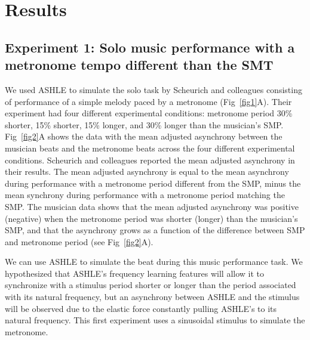 \documentclass[10pt,letterpaper]{article}
\begin{document}
\section*{Results}

\subsection*{Experiment 1: Solo music performance with a metronome tempo different than the SMT}

We used ASHLE to simulate the solo task by Scheurich and colleagues \cite{scheurich2018tapping} consisting of performance of a simple melody paced by a metronome (Fig~\ref{fig1}A). Their experiment had four different experimental conditions: metronome period 30\% shorter, 15\% shorter, 15\% longer, and 30\% longer than the musician's SMP. Fig~\ref{fig2}A shows the data with the mean adjusted asynchrony between the musician beats and the metronome beats across the four different experimental conditions. Scheurich and colleagues \cite{scheurich2018tapping} reported the mean adjusted asynchrony in their results. The mean adjusted asynchrony is equal to the mean asynchrony during performance with a metronome period different from the SMP, minus the mean synchrony during performance with a metronome period matching the SMP. The musician data shows that the mean adjusted asynchrony was positive (negative) when the metronome period was shorter (longer) than the musician's SMP, and that the asynchrony grows as a function of the difference between SMP and metronome period (see Fig~\ref{fig2}A). 

We can use ASHLE to simulate the beat during this music performance task. We hypothesized that ASHLE's frequency learning features will allow it to synchronize with a stimulus period shorter or longer than the period associated with its natural frequency, but an asynchrony between ASHLE and the stimulus will be observed due to the elastic force constantly pulling ASHLE's to its natural frequency. This first experiment uses a sinusoidal stimulus to simulate the metronome.
\end{document}
